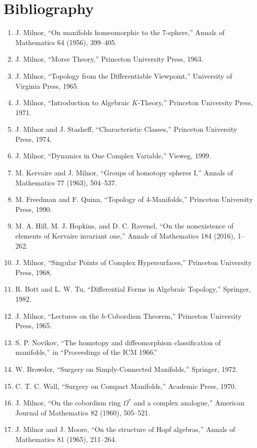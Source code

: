 \section*{Bibliography}
\begin{enumerate}
\item J. Milnor, ``On manifolds homeomorphic to the 7-sphere,'' Annals of Mathematics 64 (1956), 399--405.
\item J. Milnor, ``Morse Theory,'' Princeton University Press, 1963.
\item J. Milnor, ``Topology from the Differentiable Viewpoint,'' University of Virginia Press, 1965.
\item J. Milnor, ``Introduction to Algebraic $K$-Theory,'' Princeton University Press, 1971.
\item J. Milnor and J. Stasheff, ``Characteristic Classes,'' Princeton University Press, 1974.
\item J. Milnor, ``Dynamics in One Complex Variable,'' Vieweg, 1999.
\item M. Kervaire and J. Milnor, ``Groups of homotopy spheres I,'' Annals of Mathematics 77 (1963), 504--537.
\item M. Freedman and F. Quinn, ``Topology of 4-Manifolds,'' Princeton University Press, 1990.
\item M. A. Hill, M. J. Hopkins, and D. C. Ravenel, ``On the nonexistence of elements of Kervaire invariant one,'' Annals of Mathematics 184 (2016), 1--262.
\item J. Milnor, ``Singular Points of Complex Hypersurfaces,'' Princeton University Press, 1968.
\item R. Bott and L. W. Tu, ``Differential Forms in Algebraic Topology,'' Springer, 1982.
\item J. Milnor, ``Lectures on the $h$-Cobordism Theorem,'' Princeton University Press, 1965.
\item S. P. Novikov, ``The homotopy and diffeomorphism classification of manifolds,'' in ``Proceedings of the ICM 1966.''
\item W. Browder, ``Surgery on Simply-Connected Manifolds,'' Springer, 1972.
\item C. T. C. Wall, ``Surgery on Compact Manifolds,'' Academic Press, 1970.
\item J. Milnor, ``On the cobordism ring $\Omega^*$ and a complex analogue,'' American Journal of Mathematics 82 (1960), 505--521.
\item J. Milnor and J. Moore, ``On the structure of Hopf algebras,'' Annals of Mathematics 81 (1965), 211--264.

\end{enumerate}
